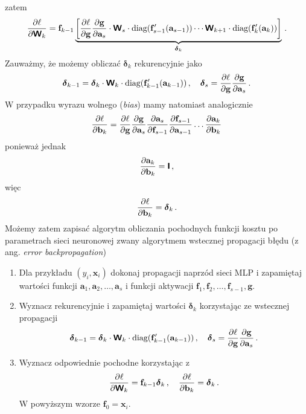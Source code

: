 \documentclass{myclass}
\begin{document}
zatem
\begin{equation*}
    \pdv{\ell}{\boldsymbol{\mathsf{W}}_k} = \mathbf{f}_{k-1} \underbrace{\left[\pdv{\ell}{\mathbf{g}}\pdv{\mathbf{g}}{\mathbf{a}_s}\cdot \boldsymbol{\mathsf{W}}_s\cdot\text{diag}(\mathbf{f}'_{s-1}(\mathbf{a}_{s-1}))\cdots \boldsymbol{\mathsf{W}}_{k+1}\cdot \text{diag}(\mathbf{f}'_{k}(\mathbf{a}_k))\right]}_{\boldsymbol{\delta}_k}\,.
\end{equation*}
Zauważmy, że możemy obliczać \(\boldsymbol{\delta}_k\) rekurencyjnie jako
\begin{equation*}
    \boldsymbol{\delta}_{k-1} = \boldsymbol{\delta}_{k}\cdot \boldsymbol{\mathsf{W}}_k\cdot\text{diag}(\mathbf{f}'_{k-1}(\mathbf{a}_{k-1}))\,,\quad \boldsymbol{\delta}_s = \pdv{\ell}{\mathbf{g}}\pdv{\mathbf{g}}{\mathbf{a}_s}\,.
\end{equation*}
W przypadku wyrazu wolnego (\textit{bias}) mamy natomiast analogicznie
\begin{equation*}
    \pdv{\ell}{\mathbf{b}_k} = \pdv{\ell}{\mathbf{g}}\pdv{\mathbf{g}}{\mathbf{a}_s}\pdv{\mathbf{a}_s}{\mathbf{f}_{s-1}}\pdv{\mathbf{f}_{s-1}}{\mathbf{a}_{s-1}}\ldots \pdv{\mathbf{a}_k}{\mathbf{b}_k}
\end{equation*}
ponieważ jednak
\begin{equation*}
    \pdv{\mathbf{a}_k}{\mathbf{b}_k} = \boldsymbol{\mathsf{I}}\,,
\end{equation*}
więc
\begin{equation*}
    \pdv{\ell}{\mathbf{b}_k} = \boldsymbol{\delta}_k\,.
\end{equation*}
Możemy zatem zapisać algorytm obliczania pochodnych funkcji kosztu po parametrach sieci neuronowej
zwany algorytmem wstecznej propagacji błędu (z ang. \textit{error backpropagation})

\begin{tcolorbox}[title=Algorytm wstecznej propagacji błędu]
\begin{enumerate}
\item Dla przykładu \((y_i, \mathbf{x}_i)\) dokonaj propagacji naprzód sieci MLP i zapamiętaj
wartości funkcji \(\mathbf{a}_1, \mathbf{a}_2, \ldots, \mathbf{a}_s\) i funkcji aktywacji
\(\mathbf{f}_1,\mathbf{f}_2,\ldots,\mathbf{f}_{s-1},\mathbf{g}\).

\item Wyznacz rekurencyjnie i zapamiętaj wartości \(\boldsymbol{\delta}_k\) korzystając ze wstecznej
propagacji
\begin{equation*}
    \boldsymbol{\delta}_{k-1} = \boldsymbol{\delta}_{k}\cdot \boldsymbol{\mathsf{W}}_k\cdot\text{diag}(\mathbf{f}'_{k-1}(\mathbf{a}_{k-1}))\,,\quad \boldsymbol{\delta}_s = \pdv{\ell}{\mathbf{g}}\pdv{\mathbf{g}}{\mathbf{a}_s}\,.
\end{equation*}

\item Wyznacz odpowiednie pochodne korzystając z
\begin{equation*}
    \pdv{\ell}{\boldsymbol{\mathsf{W}}_k} = \mathbf{f}_{k-1}\boldsymbol{\delta}_k\,,\quad \pdv{\ell}{\mathbf{b}_k} = \boldsymbol{\delta}_k\,.
\end{equation*}
W powyższym wzorze \(\mathbf{f}_0 = \mathbf{x}_i\).
\end{enumerate}
\end{tcolorbox}
\end{document}

